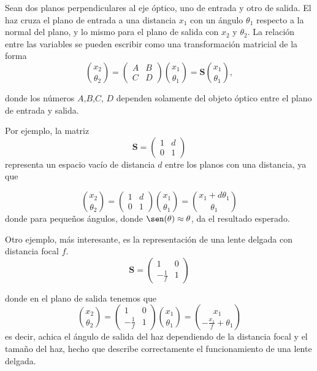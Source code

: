 Sean dos planos perpendiculares al eje óptico, uno de entrada y otro de salida. El haz cruza el plano de entrada a una distancia $x_1$ con un ángulo $\theta_1$ respecto a la normal del plano, y lo mismo para el plano de salida con $x_2$ y $\theta_2$. La relación entre las variables se pueden escribir como una transformación matricial de la forma
\begin{equation}
{x_2 \choose \theta_2} = \begin{pmatrix} A & B \\ C & D \end{pmatrix}{x_1 \choose \theta_1} = \boldsymbol{S}  {x_1 \choose \theta_1} ,
\end{equation}

donde los números $A$,$B$,$C$, $D$ dependen solamente del objeto óptico entre el plano de entrada y salida. 

Por ejemplo, la matriz
\begin{equation}
\boldsymbol{S} = \begin{pmatrix} 1 & d \\ 0 & 1 \end{pmatrix}
\end{equation}
representa un espacio vacío de distancia $d$ entre los planos con una distancia, ya que

\[ {x_2 \choose \theta_2} = \begin{pmatrix} 1 & d \\ 0 & 1 \end{pmatrix}{x_1 \choose \theta_1} = {x_1 + d \theta_1 \choose \theta_1} \]
donde para pequeños ángulos, donde $\sen(\theta) \approx \theta$, da el resultado esperado.

Otro ejemplo, más interesante, es la representación de una lente delgada con distancia focal $f$.
\begin{equation}
\boldsymbol{S} = \begin{pmatrix} 1 & 0 \\ -\frac{1}{f} & 1 \end{pmatrix}
\end{equation}

donde en el plano de salida tenemos que
\[  {x_2 \choose \theta_2} = \begin{pmatrix} 1 & 0 \\ -\frac{1}{f} & 1 \end{pmatrix}{x_1 \choose \theta_1} = {x_1 \choose -\frac{x_1}{f} + \theta_1}\]
es decir, achica el ángulo de salida del haz dependiendo de la distancia focal y el tamaño del haz, hecho que describe correctamente el funcionamiento de una lente delgada.

